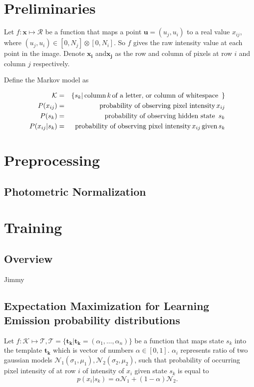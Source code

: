 \documentclass[a4paper,12pt]{article}
\newcounter{ohNoteCounter}
\newcommand{\ohnote}[1]{{\scriptsize  \color{Cgreen} $\clubsuit$~\refstepcounter{ohNoteCounter}\textsf{[OH]$_{\arabic{ohNoteCounter}}$:{#1}}}}
\newcounter{jpNoteCounter}
\newcommand{\jpnote}[1]{{\scriptsize  \color{Cblue} $\blacksquare$ \refstepcounter{jpNoteCounter}\textsf{[JP]$_{\arabic{jpNoteCounter}}$:{#1}}}}
\renewcommand{\jpnote}[1]{}
\renewcommand{\ohnote}[1]{}
\begin{document}
  \pagestyle{empty}
  \ohnote{This is useful way to leave notes. Both of us have command tu leave notes. I have \textbackslash ohnote, you have \textbackslash jpnote. Notes in whole document can be disabled by creating file with name ``.notes\_disabled''. }

  \jpnote{Your notes will look like this }

  \section{Preliminaries}
  Let $f : \mathbf{x} \mapsto \mathcal{R}$ be a function that maps a point $\mathbf{u} = (u_j,u_i)$ to a real value $x_{ij}$, where $(u_j,u_i) \in [0,N_j] \otimes [0,N_i]$.  So $f$ gives the raw intensity value at each point in the image.  Denote $\mathbf{x_i}$ and$\mathbf{x_j}$  as the row and column of pixels at row $i$ and column $j$ respectively.  

  Define the Markov model as 

  \begin{eqnarray*}
    \mathcal{K} &=& \{ s_k | \text{\,column\,} k \text{\,of a letter, or column of whitespace \,} \} \\
    P(x_{ij}) &=& \text{probability of observing pixel intensity\,} x_{ij} \\
    P(s_k) &=& \text{probability of observing hidden state \,} s_{k} \\
    P(x_{ij}|s_k) &=& \text{probability of observing pixel intensity\,} x_{ij} \text{\,given\,} s_k  
  \end{eqnarray*}

  \section{Preprocessing}
  \subsection{Photometric Normalization}

  \section{Training}
  \subsection{Overview}
  Jimmy

  \subsection{Expectation Maximization for Learning Emission probability distributions}
  Let $f : \mathcal{K} \mapsto \mathcal{T}, \mathcal{T} = \{ \mathbf{t_k} | \mathbf{t_k} = (\alpha_1 , \dots , \alpha_n)\}$ be a function that maps state $s_k$ into the template $\mathbf{t_k}$ which is vector of numbers $\alpha \in [0, 1]$. $\alpha_i$ represents ratio of two gaussian models $\mathcal{N}_1(\sigma_1, \mu_1), \mathcal{N}_2(\sigma_2, \mu_2)$, such that probability of occurring pixel intensity of at row $i$ of intensity of $x_i$ given state $s_k$ is equal to
  	\[
	p(x_i | s_k) = \alpha  \mathcal{N}_1 +  (1-\alpha) \mathcal{N}_2 .
	\]
  
\end{document}
